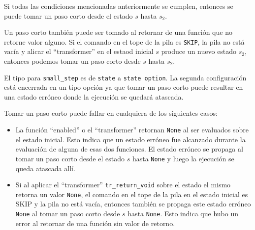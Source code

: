 Si todas las condiciones mencionadas anteriormente se cumplen, entonces se puede tomar un paso corto desde el estado $s$ hasta $s_{2}$.

Un paso corto también puede ser tomado al retornar de una función que no retorne valor alguno.
Si el comando en el tope de la pila es \verb|SKIP|, la pila no está vacía y alicar el ``transformer'' en el estaod inicial $s$ produce un nuevo estado $s_{2}$, entonces podemos tomar un paso corto desde $s$ hasta $s_{2}$.

El tipo para \verb|small_step| es de \verb|state| a \verb|state option|.
La segunda configuración está encerrada en un tipo opción ya que tomar un paso corto puede resultar en una estado erróneo donde la ejecución se quedará atascada.

Tomar un paso corto puede fallar en cualquiera de los siguientes casos:

\begin{itemize}
  \item{La función ``enabled'' o el ``transformer'' retornan \verb|None| al ser evaluados sobre el estado inicial.
  Esto indica que un estado erróneo fue alcanzado durante la evaluación de alguna de esas dos funciones.
  El estado erróneo se propaga al tomar un paso corto desde el estado $s$ hasta \verb|None| y luego la ejecución se queda atascada allí.}
  \item{Si al aplicar el ``transformer'' \verb|tr_return_void| sobre el estado el mismo retorna un valor \verb|None|, el comando en el tope de la pila en el estado inicial es SKIP y la pila no está vacía, entonces también se propaga este estado erróneo \verb|None| al tomar un paso corto desde $s$ hasta \verb|None|.
  Esto indica que hubo un error al retornar de una función sin valor de retorno.}
\end{itemize}


